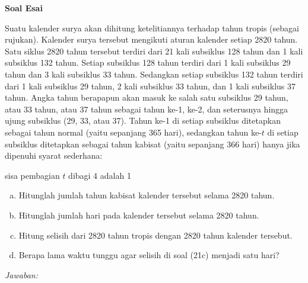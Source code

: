 \documentclass[11pt,fleqn]{exam}
\begin{document}
\begin{questions}
\vspace{0.5cm}
\textbf{Soal Esai}

\question Suatu kalender surya akan dihitung ketelitiannya terhadap tahun tropis (sebagai rujukan). Kalender surya tersebut mengikuti aturan kalender setiap 2820 tahun. Satu siklus 2820 tahun tersebut terdiri dari 21 kali subsiklus 128 tahun dan 1 kali subsiklus 132 tahun. Setiap subsiklus 128 tahun terdiri dari 1 kali subsiklus 29 tahun dan 3 kali subsiklus 33 tahun. Sedangkan setiap subsiklus 132 tahun terdiri dari 1 kali subsiklus 29 tahun, 2 kali subsiklus 33 tahun, dan 1 kali subsiklus 37 tahun. Angka tahun berapapun akan masuk ke salah satu subsiklus 29 tahun, atau 33 tahun, atau 37 tahun sebagai tahun ke-1, ke-2, dan seterusnya hingga ujung subsiklus (29, 33, atau 37). Tahun ke-1 di setiap subsiklus ditetapkan sebagai tahun normal (yaitu sepanjang 365 hari), sedangkan tahun ke-$t$ di setiap subsiklus ditetapkan sebagai tahun kabisat (yaitu sepanjang 366 hari) hanya jika dipenuhi syarat sederhana:

\begin{center}
sisa pembagian $t$ dibagi 4 adalah 1\\
\end{center}

\begin{enumerate}[(a)]
\item Hitunglah jumlah tahun kabisat kalender tersebut selama 2820 tahun.
\item Hitunglah jumlah hari pada kalender tersebut selama 2820 tahun.
\item Hitung selisih dari 2820 tahun tropis dengan 2820 tahun kalender tersebut.
\item Berapa lama waktu tunggu agar selisih di soal (21c) menjadi satu hari? \\
\end{enumerate}


\textit{Jawaban: } \\


\end{questions}
\end{document}
